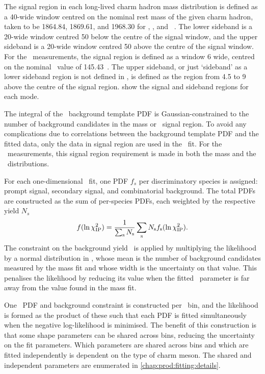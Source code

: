 The signal region in each long-lived charm hadron mass distribution is defined 
as a \SI{40}{\MeVcc}-wide window centred on the nominal rest mass of the given 
charm hadron, taken to be \SI{1864.84}{\MeVcc}, \SI{1869.61}{\MeVcc}, and 
\SI{1968.30}{\MeVcc} for \PDzero, \PDplus, and \PDsplus~\cite{PDG2014}.
The lower sideband is a \SI{20}{\MeVcc}-wide window centred \SI{50}{\MeVcc} 
below the centre of the signal window, and the upper sideband is a 
\SI{20}{\MeVcc}-wide window centred \SI{50}{\MeVcc} above the centre of the 
signal window.
For the \PDstarp\ measurements, the signal region is defined as a window 
\SI{6}{\MeVcc} wide, centred on the nominal \deltam\ value of 
\SI{145.43}{\MeVcc}~\cite{PDG2014}.
The upper sideband, or just `sideband' as a lower sideband region is not 
defined in \deltam, is defined as the region from \SI{4.5}{\MeVcc} to 
\SI{9}{\MeVcc} above the centre of the signal region.
show the signal and sideband regions for each mode.

The integral of the \lnipchisq\ background template \ac{PDF} is 
Gaussian-constrained to the number of background candidates in the mass or 
\deltam\ signal region.
To avoid any complications due to correlations between the background template 
\ac{PDF} and the fitted data, only the data in signal region are used in the 
\lnipchisq\ fit.
For the \PDstarp\ measurements, this signal region requirement is made in both 
the \PDzero mass and the \deltam\ distributions.

For each one-dimensional \lnipchisq\ fit, one \ac{PDF} $f_{s}$ per 
discriminatory species is assigned: prompt signal, secondary signal, and 
combinatorial background.
The total \acp{PDF} are constructed as the sum of per-species \acp{PDF}, 
each weighted by the respective yield $N_{s}$
\begin{equation}
  f(\ln\chi^2_{\textnormal{IP}}) = \frac{1}{\sum_{\textnormal{s}} N_{\textnormal{s}}}
                  \sum_{\text{s}} N_{\text{s}}
                  f_{\text{s}}(\ln\chi^2_{\textnormal{IP}}).
\end{equation}
The constraint on the background yield \nbkg\ is applied by multiplying the 
likelihood by a normal distribution in \nbkg, whose mean is the number of 
background candidates measured by the mass fit and whose width is the 
uncertainty on that value.
This penalises the likelihood by reducing its value when the fitted \nbkg\ 
parameter is far away from the value found in the mass fit.

One \lnipchisq\ \ac{PDF} and background constraint is constructed per \pTy\ 
bin, and the likelihood is formed as the product of these such that each 
\ac{PDF} is fitted simultaneously when the negative log-likelihood is 
minimised.
The benefit of this construction is that some shape parameters can be shared 
across bins, reducing the uncertainty on the fit parameters.
Which parameters are shared across bins and which are fitted independently is 
dependent on the type of charm meson.
The shared and independent parameters are enumerated in 
\cref{chap:prod:fitting:details}.

